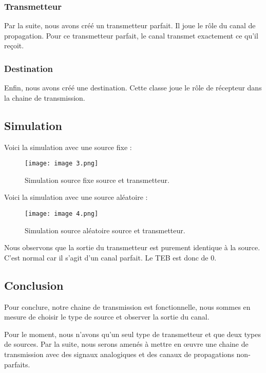 \subsubsection{Transmetteur}

Par la suite, nous avons créé un transmetteur parfait. Il joue le rôle du canal de propagation. Pour ce transmetteur parfait, le canal transmet exactement ce qu'il reçoit.

\subsubsection{Destination}

Enfin, nous avons créé une destination. Cette classe joue le rôle de récepteur dans la chaine de transmission.

\subsection{Simulation}

Voici la simulation avec une source fixe :
\begin{figure}[H]
    \centering
    \texttt{[image: image 3.png]}
    \caption{\label{fig:image3}Simulation source fixe source et transmetteur.}
\end{figure}

Voici la simulation avec une source aléatoire :
\begin{figure}[H]
    \centering
    \texttt{[image: image 4.png]}
    \caption{\label{fig:image4}Simulation source aléatoire source et transmetteur.}
\end{figure}

Nous observons que la sortie du transmetteur est purement identique à la source. C'est normal car il s'agit d'un canal parfait. Le TEB est donc de 0.

\subsection{Conclusion}

Pour conclure, notre chaine de transmission est fonctionnelle, nous sommes en mesure de choisir le type de source et observer la sortie du canal.

Pour le moment, nous n'avons qu'un seul type de transmetteur et que deux types de sources. Par la suite, nous serons amenés à mettre en œuvre une chaine de transmission avec des signaux analogiques et des canaux de propagations non-parfaits.




